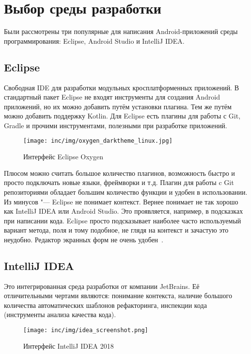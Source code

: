 \section{Выбор среды разработки}
\label{sec:ide}
Были рассмотрены три популярные для написания Android-приложений среды программирования: Eclipse, Android Studio и IntelliJ IDEA\@.

\subsection{Eclipse}
\label{subsec:eclipse}
Свободная IDE для разработки модульных кросплатформенных приложений.
В стандартный пакет Eclipse не входят инструменты для создания Android приложений, но их можно добавить путём установки плагина.
Тем же путём можно добавить поддержку Kotlin.
Для Eclipse есть плагины для работы с Git, Gradle и прочими инструментами, полезными при разработке приложений.

\begin{figure}[ht]
  \centering
  \texttt{[image: inc/img/oxygen\_darktheme\_linux.jpg]}
  \caption{Интерфейс Eclipse Oxygen}
  \label{fig:eclipse}
\end{figure}

Плюсом можно считать большое количество плагинов, возможность быстро и просто подключать новые языки, фреймворки и т.д.
Плагин для работы c Git репозиториями обладает большим количество функции и удобен в использовании.
Из минусов "--- Eclipse не понимает контекст.
Вернее понимает не так хорошо как IntelliJ IDEA или Android Studio.
Это проявляется, например, в подсказках при написании кода.
Eclipse просто подсказывает наиболее часто используемый вариант метода, поля и тому подобное, не глядя на контекст и зачастую это неудобно.
Редактор экранных форм не очень удобен~\cite{eclipse:oxygen}.

\subsection{IntelliJ IDEA}
\label{subsec:idea}
Это интегрированная среда разработки от компании JetBrains.
Её отличительными чертами являются: понимание контекста, наличие большого количества автоматических шаблонов рефакторинга, инспекции кода (инструменты анализа качества кода).

\begin{figure}[ht]
  \centering
  \texttt{[image: inc/img/idea\_screenshot.png]}
  \caption{Интерфейс IntelliJ IDEA 2018}
  \label{fig:idea}
\end{figure}

